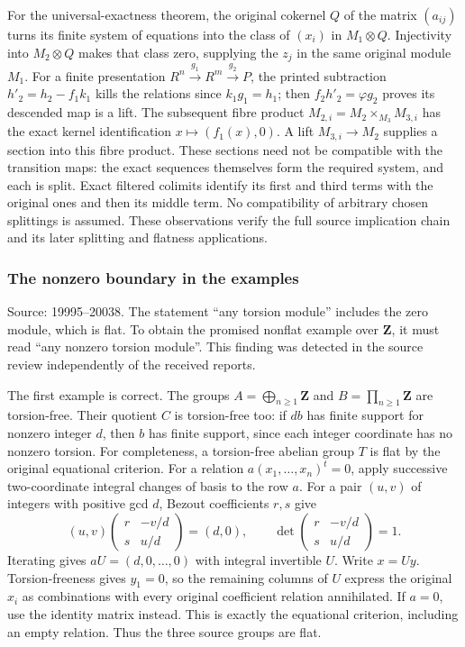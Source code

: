 For the universal-exactness theorem, the original cokernel \(Q\) of the matrix \((a_{ij})\) turns its finite system of equations into the class of \((x_i)\) in \(M_1\otimes Q\). Injectivity into \(M_2\otimes Q\) makes that class zero, supplying the \(z_j\) in the same original module \(M_1\). For a finite presentation \(R^n\xrightarrow{g_1}R^m\xrightarrow{g_2}P\), the printed subtraction \(h'_2=h_2-f_1k_1\) kills the relations since \(k_1g_1=h_1\); then \(f_2h'_2=\varphi g_2\) proves its descended map is a lift. The subsequent fibre product \(M_{2,i}=M_2\times_{M_3}M_{3,i}\) has the exact kernel identification \(x\mapsto(f_1(x),0)\). A lift \(M_{3,i}\to M_2\) supplies a section into this fibre product. These sections need not be compatible with the transition maps: the exact sequences themselves form the required system, and each is split. Exact filtered colimits identify its first and third terms with the original ones and then its middle term. No compatibility of arbitrary chosen splittings is assumed. These observations verify the full source implication chain and its later splitting and flatness applications.

\subsubsection{The nonzero boundary in the examples}\label{algebra-proof-010-the-nonzero-boundary-in-the-examples}

Source: 19995--20038. The statement ``any torsion module'' includes the zero module, which is flat. To obtain the promised nonflat example over \(\mathbf Z\), it must read ``any nonzero torsion module''. This finding was detected in the source review independently of the received reports.

The first example is correct. The groups \(A=\bigoplus_{n\geq1}\mathbf Z\) and \(B=\prod_{n\geq1}\mathbf Z\) are torsion-free. Their quotient \(C\) is torsion-free too: if \(d b\) has finite support for nonzero integer \(d\), then \(b\) has finite support, since each integer coordinate has no nonzero torsion. For completeness, a torsion-free abelian group \(T\) is flat by the original equational criterion. For a relation \(a(x_1,\ldots,x_n)^t=0\), apply successive two-coordinate integral changes of basis to the row \(a\). For a pair \((u,v)\) of integers with positive gcd \(d\), Bezout coefficients \(r,s\) give \[
(u,v)\begin{pmatrix}r&-v/d\\s&u/d\end{pmatrix}=(d,0),
\qquad \det\begin{pmatrix}r&-v/d\\s&u/d\end{pmatrix}=1.
\] Iterating gives \(aU=(d,0,\ldots,0)\) with integral invertible \(U\). Write \(x=Uy\). Torsion-freeness gives \(y_1=0\), so the remaining columns of \(U\) express the original \(x_i\) as combinations with every original coefficient relation annihilated. If \(a=0\), use the identity matrix instead. This is exactly the equational criterion, including an empty relation. Thus the three source groups are flat.

